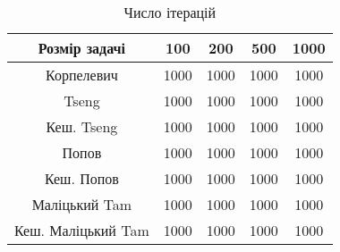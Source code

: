 \begin{table}[H]
	\centering
	\begin{tabular}{|c||c|c|c|c|}\hline
		Розмір задачі & 100 & 200 & 500 & 1000 \\ \hline \hline
		Корпелевич & 1000 & 1000 & 1000 & 1000 \\ \hline
		Tseng & 1000 & 1000 & 1000 & 1000 \\ \hline
		Кеш. Tseng & 1000 & 1000 & 1000 & 1000 \\ \hline
		Попов & 1000 & 1000 & 1000 & 1000 \\ \hline
		Кеш. Попов & 1000 & 1000 & 1000 & 1000 \\ \hline
		Маліцький Tam & 1000 & 1000 & 1000 & 1000 \\ \hline
		Кеш. Маліцький Tam & 1000 & 1000 & 1000 & 1000 \\ \hline
	\end{tabular}
	\caption{Число ітерацій}
\end{table}
